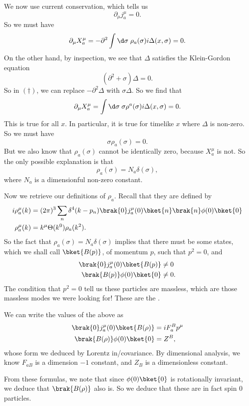 \documentclass[a4paper]{article}
\begin{document}
We now use current conservation, which tells us
\[
  \partial_\mu j^\mu_a = 0.
\]
So we must have
\[
  \partial_\mu X_a^\mu =- \partial^2  \int \d \sigma\; \rho_a(\sigma) i \Delta(x, \sigma) = 0.
\]
On the other hand, by inspection, we see that $\Delta$ satisfies the Klein-Gordon equation
\[
  (\partial^2 + \sigma) \Delta = 0.
\]
So in $(\dagger)$, we can replace $-\partial^2 \Delta$ with $\sigma \Delta$. So we find that
\[
  \partial_\mu X_a^\mu = \int \d \sigma\; \sigma \rho^a (\sigma) i \Delta(x, \sigma) = 0.
\]
This is true for all $x$. In particular, it is true for timelike $x$ where $\Delta$ is non-zero. So we must have
\[
  \sigma \rho_a(\sigma) = 0.
\]
But we also know that $\rho_a(\sigma)$ cannot be identically zero, because $X_a^\mu$ is not. So the only possible explanation is that
\[
  \rho_a(\sigma) = N_a \delta(\sigma),
\]
where $N_a$ is a dimensionful non-zero constant.

Now we retrieve our definitions of $\rho_a$. Recall that they are defined by
\begin{align*}
  i \rho_a^\mu (k) &= (2\pi)^3 \sum_n \delta^4(k - p_n)\brak{0}j_a^\mu(0) \bket{n} \brak{n}\phi(0)\bket{0}\\
  \rho_a^\mu (k) &= k^\mu \Theta(k^0) \rho_a (k^2).
\end{align*}
So the fact that $\rho_a(\sigma) = N_a \delta(\sigma)$ implies that there must be some states, which we shall call $\bket{B(p)}$, of momentum $p$, such that $p^2 = 0$, and
\begin{align*}
  \brak{0}j_a^\mu(0)\bket{B(p)} &\not= 0\\
  \brak{B(p)} \phi(0) \bket{0} &\not= 0.
\end{align*}
The condition that $p^2 = 0$ tell us these particles are massless, which are those massless modes we were looking for! These are the .

We can write the values of the above as
\begin{align*}
  \brak{0} j_a^\mu (0)\bket{B(\rho)} &= i F_a^B p^\mu\\
  \brak{B(\rho)} \phi(0)\bket{0} &= Z^B,
\end{align*}
whose form we deduced by Lorentz in/covariance. By dimensional analysis, we know $F_{aB}$ is a dimension $-1$ constant, and $Z_B$ is a dimensionless constant.

From these formulas, we note that since $\phi(0)\bket{0}$ is rotationally invariant, we deduce that $\brak{B(\rho)}$ also is. So we deduce that these are in fact spin $0$ particles.
\end{document}
